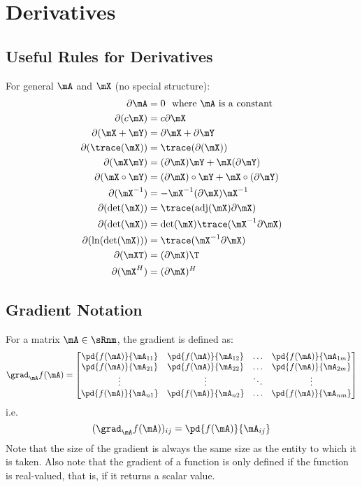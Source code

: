 
\chapter{Derivatives}

\section{Useful Rules for Derivatives}
For general $\mA$ and $\mX$ (no special structure):
\begin{align}
\partial\mA           &= 0~~\textrm{where $\mA$ is a constant} \\
\partial(c\mX)        &= c\partial\mX                          \\
\partial(\mX+\mY)     &= \partial\mX+\partial\mY               \\
\partial(\trace(\mX)) &= \trace(\partial(\mX))                 \\
\partial(\mX\mY)      &= (\partial\mX)\mY + \mX(\partial\mY)   \\
\partial(\mX\circ\mY) &= (\partial\mX)\circ\mY + \mX\circ(\partial\mY) \\
\partial(\mX^{-1})    &= -\mX^{-1}(\partial\mX)\mX^{-1}        \\
\partial(\det(\mX))   &= \trace(\textrm{adj}(\mX)\partial\mX)  \\
\partial(\det(\mX))   &= \det(\mX)\trace(\mX^{-1}\partial\mX)  \\
\partial(\ln(\det(\mX))) &= \trace(\mX^{-1}\partial\mX)        \\
\partial(\mXT)       &= (\partial\mX)\T                       \\
\partial(\mX^H)       &= (\partial\mX)^H
\end{align}

\section{Gradient Notation}
For a matrix $\mA\in\sRnm$, the gradient is defined as:
\begin{equation}
\grad_\mA f(\mA)=
\begin{bmatrix}
\pd{f(\mA)}{\mA_{11}} & \pd{f(\mA)}{\mA_{12}} & \ldots & \pd{f(\mA)}{\mA_{1m}} \\
\pd{f(\mA)}{\mA_{21}} & \pd{f(\mA)}{\mA_{22}} & \ldots & \pd{f(\mA)}{\mA_{2m}} \\
\vdots                & \vdots                & \ddots & \vdots                \\
\pd{f(\mA)}{\mA_{n1}} & \pd{f(\mA)}{\mA_{n2}} & \ldots & \pd{f(\mA)}{\mA_{nm}}
\end{bmatrix}
\end{equation}
i.e.
\begin{equation}
(\grad_\mA f(\mA))_{ij}=\pd{f(\mA)}{\mA_{ij}}
\end{equation}
Note that the size of the gradient is always the same size as the entity to which it is taken. Also note that the gradient of a function is only defined if the function is real-valued, that is, if it returns a scalar value.

